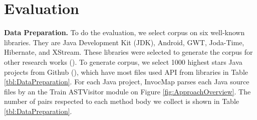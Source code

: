\section{Evaluation}
\textbf{Data Preparation.} To do the evaluation, we select corpus on six well-known libraries. They are Java Development Kit (JDK), Android, GWT, Joda-Time, Hibernate, and XStream. These libraries were selected to generate the corpus for other research works (\cite{8453132,Subramanian:2014:LAD:2568225.2568313}). To generate corpus, we select 1000 highest stars Java projects from Github (\cite{id:Github}), which have most files used API from libraries in Table \ref{tbl:DataPreparation}. For each Java project, InvocMap parses each Java source files by an the Train ASTVisitor module on Figure \ref{fig:ApproachOverview}. The number of pairs respected to each method body we collect is shown in Table \ref{tbl:DataPreparation}. 

